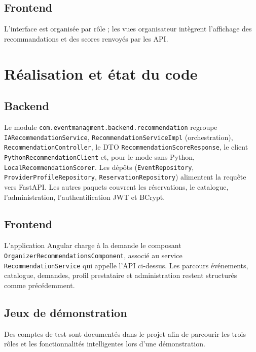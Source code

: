 \documentclass[a4paper,12pt]{report}
\begin{document}
\section{Frontend}

L'interface est organisée par rôle ; les vues organisateur intègrent l'affichage des recommandations et des scores renvoyés par les API.

\chapter{Réalisation et état du code}
\label{chap:real}

\section{Backend}

Le module \texttt{com.eventmanagment.backend.recommendation} regroupe \texttt{IARecommendationService}, \texttt{RecommendationServiceImpl} (orchestration), \texttt{RecommendationController}, le DTO \texttt{RecommendationScoreResponse}, le client \texttt{PythonRecommendationClient} et, pour le mode sans Python, \texttt{LocalRecommendationScorer}. Les dépôts (\texttt{EventRepository}, \texttt{ProviderProfileRepository}, \texttt{ReservationRepository}) alimentent la requête vers FastAPI. Les autres paquets couvrent les réservations, le catalogue, l'administration, l'authentification JWT et BCrypt.

\section{Frontend}

L'application Angular charge à la demande le composant \texttt{OrganizerRecommendationsComponent}, associé au service \texttt{RecommendationService} qui appelle l'API ci-dessus. Les parcours événements, catalogue, demandes, profil prestataire et administration restent structurés comme précédemment.

\section{Jeux de démonstration}

Des comptes de test sont documentés dans le projet afin de parcourir les trois rôles et les fonctionnalités intelligentes lors d'une démonstration.

\end{document}
